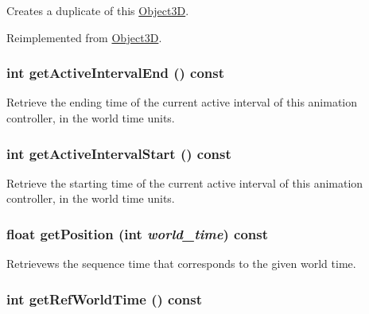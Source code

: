 Creates a duplicate of this \hyperlink{classm3g_1_1Object3D}{Object3D}. 

Reimplemented from \hyperlink{classm3g_1_1Object3D_a25110dac934f867b83b73ad4741a0f4}{Object3D}.\hypertarget{classm3g_1_1AnimationController_7caa95c7ed5a03844abe328feaae4911}{
\subsubsection[{getActiveIntervalEnd}]{\setlength{\rightskip}{0pt plus 5cm}int getActiveIntervalEnd () const}}
\label{classm3g_1_1AnimationController_7caa95c7ed5a03844abe328feaae4911}


Retrieve the ending time of the current active interval of this animation controller, in the world time units. \hypertarget{classm3g_1_1AnimationController_c66e837ae4152477eabdfcbe7fb21adb}{
\subsubsection[{getActiveIntervalStart}]{\setlength{\rightskip}{0pt plus 5cm}int getActiveIntervalStart () const}}
\label{classm3g_1_1AnimationController_c66e837ae4152477eabdfcbe7fb21adb}


Retrieve the starting time of the current active interval of this animation controller, in the world time units. \hypertarget{classm3g_1_1AnimationController_dfdea73153cb34c26979575efda149e2}{
\subsubsection[{getPosition}]{\setlength{\rightskip}{0pt plus 5cm}float getPosition (int {\em world\_\-time}) const}}
\label{classm3g_1_1AnimationController_dfdea73153cb34c26979575efda149e2}


Retrievews the sequence time that corresponds to the given world time. \hypertarget{classm3g_1_1AnimationController_103e1bd81eba2cc90f31e7fdc4f3c601}{
\subsubsection[{getRefWorldTime}]{\setlength{\rightskip}{0pt plus 5cm}int getRefWorldTime () const}}
\label{classm3g_1_1AnimationController_103e1bd81eba2cc90f31e7fdc4f3c601}


